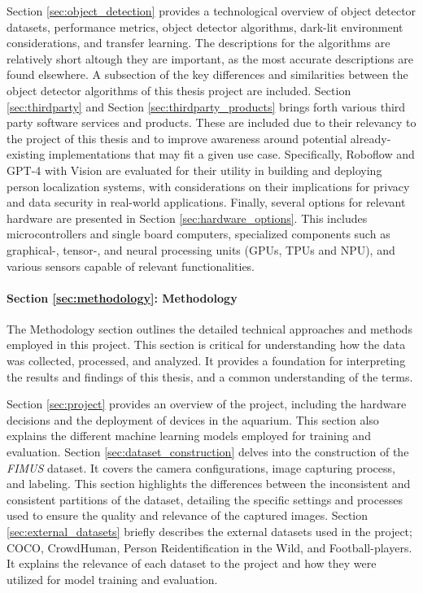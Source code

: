 Section \ref{sec:object_detection} provides a technological overview of object detector datasets, performance metrics, object detector algorithms, dark-lit environment considerations, and transfer learning. The descriptions for the algorithms are relatively short altough they are important, as the most accurate descriptions are found elsewhere. A subsection of the key differences and similarities between the object detector algorithms of this thesis project are included. Section \ref{sec:thirdparty} and Section \ref{sec:thirdparty_products} brings forth various third party software services and products. These are included due to their relevancy to the project of this thesis and to improve awareness around potential already-existing implementations that may fit a given use case. Specifically, Roboflow and GPT-4 with Vision are evaluated for their utility in building and deploying person localization systems, with considerations on their implications for privacy and data security in real-world applications. Finally, several options for relevant hardware are presented in Section \ref{sec:hardware_options}. This includes microcontrollers and single board computers, specialized components such as graphical-, tensor-, and neural processing units (GPUs, TPUs and NPU), and various sensors capable of relevant functionalities.

\paragraph{Section \ref{sec:methodology}: Methodology}
The Methodology section outlines the detailed technical approaches and methods employed in this project. This section is critical for understanding how the data was collected, processed, and analyzed. It provides a foundation for interpreting the results and findings of this thesis, and a common understanding of the terms.

Section \ref{sec:project} provides an overview of the project, including the hardware decisions and the deployment of devices in the aquarium. This section also explains the different machine learning models employed for training and evaluation. Section \ref{sec:dataset_construction} delves into the construction of the \textit{FIMUS} dataset. It covers the camera configurations, image capturing process, and labeling. This section highlights the differences between the inconsistent and consistent partitions of the dataset, detailing the specific settings and processes used to ensure the quality and relevance of the captured images. Section \ref{sec:external_datasets} briefly describes the external datasets used in the project; COCO, CrowdHuman, Person Reidentification in the Wild, and Football-players. It explains the relevance of each dataset to the project and how they were utilized for model training and evaluation.

